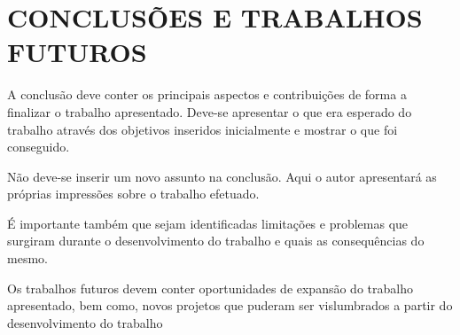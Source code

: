 \section{CONCLUSÕES E TRABALHOS FUTUROS}
A conclusão deve conter os principais aspectos e contribuições de forma a finalizar o trabalho apresentado. Deve-se apresentar o que era esperado do trabalho através dos objetivos inseridos inicialmente e mostrar o que foi conseguido. 

	Não deve-se inserir um novo assunto na conclusão. Aqui o autor apresentará as próprias impressões sobre o trabalho efetuado. 
    
É importante também que sejam identificadas limitações e problemas que surgiram durante o desenvolvimento do trabalho e quais as consequências do mesmo.

Os trabalhos futuros devem conter oportunidades de expansão do trabalho apresentado, bem como, novos projetos que puderam ser vislumbrados a partir do desenvolvimento do trabalho